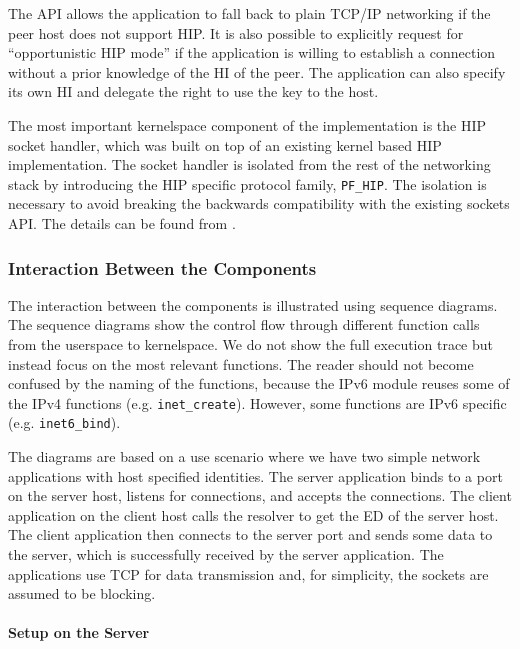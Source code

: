 The API allows the application to fall back to plain TCP/IP networking
if the peer host does not support HIP. It is also possible to
explicitly request for ``opportunistic HIP mode'' if the application
is willing to establish a connection without a prior knowledge of the
HI of the peer. The application can also specify its own HI and
delegate the right to use the key to the host.

The most important kernelspace component of the implementation is the
HIP socket handler, which was built on top of an existing kernel based
HIP implementation.  The socket handler is isolated from the rest of
the networking stack by introducing the HIP specific protocol family,
\verb|PF_HIP|. The isolation is necessary to avoid breaking the
backwards compatibility with the existing sockets API. The details can
be found from \cite{hipapithesis}.

\subsubsection{Interaction Between the Components}

The interaction between the components is illustrated using sequence
diagrams. The sequence diagrams show the control flow through
different function calls from the userspace to kernelspace. We do
not show the full execution trace but instead focus on the most
relevant functions. The reader should not become confused by the naming
of the functions, because the IPv6 module reuses some of the IPv4
functions (e.g. \verb|inet_create|). However, some functions are IPv6
specific (e.g. \verb|inet6_bind|).

The diagrams are based on a use scenario where we have two simple
network applications with host specified identities. The server
application binds to a port on the server host, listens for
connections, and accepts the connections. The client application on
the client host calls the resolver to get the ED of the server
host. The client application then connects to the server port and
sends some data to the server, which is successfully received by the
server application. The applications use \ac{TCP} for data
transmission and, for simplicity, the sockets are assumed to be
blocking.

\paragraph{Setup on the Server}

